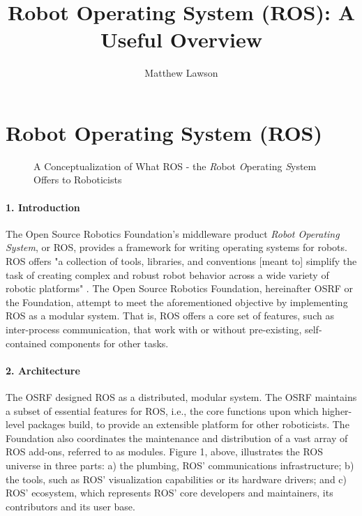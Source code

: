 \documentclass[9pt,twocolumn,twoside]{styles/osajnl}
\title{Robot Operating System (ROS): A Useful Overview}
\author[1]{Matthew Lawson}
\affil[1]{School of Informatics and Computing, Bloomington, IN 47408, U.S.A.}
\affil[*]{Corresponding authors: laszewski@gmail.com}
\begin{document}
\maketitle

\section{Robot Operating System (ROS)}

\begin{figure*}[htbp]
\centering
{}
\caption{A Conceptualization of What ROS - the \textit{R}obot \textit{O}perating \textit{S}ystem Offers to Roboticists \cite{www-ros-ros-is}}
\label{fig:rosOverview}
\end{figure*}

\paragraph{1. Introduction}

The Open Source Robotics Foundation's middleware product \textit{Robot Operating System}, or ROS, provides a framework for writing operating systems for robots.  ROS offers "a collection of tools, libraries, and conventions [meant to] simplify the task of creating complex and robust robot behavior across a wide variety of robotic platforms" \cite{www-ros-about}. The Open Source Robotics Foundation, hereinafter OSRF or the Foundation, attempt to meet the aforementioned objective by implementing ROS as a modular system.  That is, ROS offers a core set of features, such as inter-process communication, that work with or without pre-existing, self-contained components for other tasks.

\paragraph{2. Architecture} 

The OSRF designed ROS as a distributed, modular system.  The OSRF maintains a subset of essential features for ROS, i.e., the core functions upon which higher-level packages build, to provide an extensible platform for other roboticists.  The Foundation also coordinates the maintenance and distribution of a vast array of ROS add-ons, referred to as modules.  Figure 1, above, illustrates the ROS universe in three parts: a) the plumbing, ROS' communications infrastructure; b) the tools, such as ROS' visualization capabilities or its hardware drivers; and c) ROS' ecosystem, which represents ROS' core developers and maintainers, its contributors and its user base.
\end{document}
